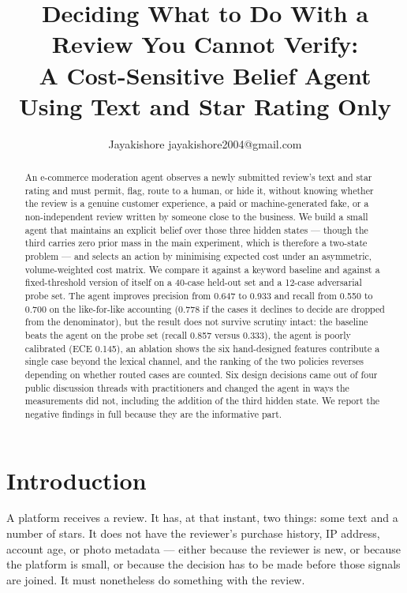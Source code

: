 \documentclass{article}
\title{Deciding What to Do With a Review You Cannot Verify:\\
A Cost-Sensitive Belief Agent Using Text and Star Rating Only}
\author{
    Jayakishore
    \emails
    jayakishore2004@gmail.com
}
\begin{document}
\maketitle

\begin{abstract}
    An e-commerce moderation agent observes a newly submitted review's text and
    star rating and must permit, flag, route to a human, or hide it, without
    knowing whether the review is a genuine customer experience, a paid or
    machine-generated fake, or a non-independent review written by someone
    close to the business. We build a small agent that maintains an explicit
    belief over those three hidden states --- though the third carries zero prior
    mass in the main experiment, which is therefore a two-state problem --- and
    selects an action by minimising expected cost under an asymmetric, volume-weighted cost matrix. We compare
    it against a keyword baseline and against a fixed-threshold version of
    itself on a 40-case held-out set and a 12-case adversarial probe set. The
    agent improves precision from 0.647 to 0.933 and recall from 0.550 to
    0.700 on the like-for-like accounting (0.778 if the cases it declines to
    decide are dropped from the denominator), but the result does not survive
    scrutiny intact: the baseline beats
    the agent on the probe set (recall 0.857 versus 0.333), the agent is
    poorly calibrated (ECE 0.145), an ablation shows the six hand-designed
    features contribute a single case beyond the lexical channel, and the
    ranking of the two policies reverses depending on whether routed cases are
    counted. Six design decisions came out of four public discussion threads with
    practitioners and changed the agent in ways the measurements did not,
    including the addition of the third hidden state. We report the negative findings in full because they are the
    informative part.
\end{abstract}

\section{Introduction}

A platform receives a review. It has, at that instant, two things: some text
and a number of stars. It does not have the reviewer's purchase history, IP
address, account age, or photo metadata --- either because the reviewer is new,
or because the platform is small, or because the decision has to be made before
those signals are joined. It must nonetheless do something with the review.
\end{document}
